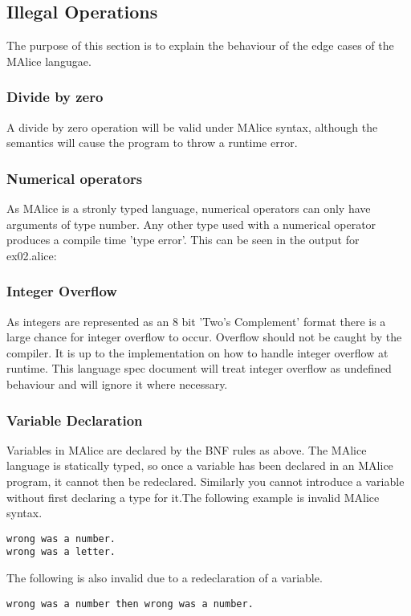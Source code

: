 \documentclass[a4wide, 10pt]{article}
\newcommand{\tab}{\hspace*{2em}}
\begin{document}
\subsection{Illegal Operations}
The purpose of this section is to explain the behaviour of the edge cases of the
MAlice langugae.

\subsubsection{Divide by zero}
A divide by zero operation will be valid under MAlice syntax, although the
semantics will cause the program to throw a runtime error.


\subsubsection{Numerical operators}
As MAlice is a stronly typed language, numerical operators can only have 
arguments of type number. Any other type used with a numerical operator
produces a compile time 'type error'. This can be seen in the output for ex02.alice:


\subsubsection{Integer Overflow}
As integers are represented as an 8 bit 'Two's Complement' format there is 
a large chance for integer overflow to occur. Overflow should not be caught
by the compiler. It is up to the implementation on how to handle integer 
overflow at runtime. This language spec document will treat integer 
overflow as undefined behaviour and will ignore it where necessary.


\subsubsection{Variable Declaration}
Variables in MAlice are declared by the BNF rules as above. The MAlice 
language is statically typed, so once a variable has been declared in an
MAlice program, it cannot then be redeclared. Similarly you cannot introduce
a variable without first declaring a type for it.The following example is
invalid MAlice syntax.

\texttt{\tab wrong was a number.\\ \tab wrong was a letter.}

The following is also invalid due to a redeclaration of a variable.

\texttt{\tab wrong was a number then wrong was a number.} 
\end{document}
